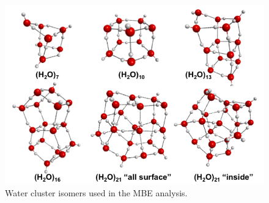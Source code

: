\begin{figure}[t]
\uwsinglespace
\centering
\includegraphics[width=\textwidth]{Figures/Chapter_2/cluster_structures.png}
\begin{spacing}{1.0}
\caption[Water cluster isomers used in the MBE analysis.]{Water cluster isomers used in the MBE analysis.}\label{fig:MBE_I_F1}
\end{spacing}
\end{figure}